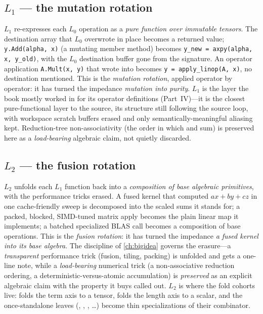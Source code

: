 \subsection*{$L_1$ --- the mutation rotation}

$L_1$ re-expresses each $L_0$ operation as a \emph{pure function over immutable
tensors}. The destination array that $L_0$ overwrote in place becomes a returned
value; \lstinline[style=l4style]|y.Add(alpha, x)| (a mutating member method) becomes
\lstinline[style=l4style]|y_new = axpy(alpha, x, y_old)|, with the $L_0$ destination
buffer gone from the signature. An operator application \lstinline[style=l4style]|A.Mult(x, y)|
that wrote into  becomes \lstinline[style=l4style]|y = apply_linop(A, x)|, no
destination mentioned. This is the \emph{mutation rotation}, applied operator by
operator: it has turned the impedance \emph{mutation into purity}. $L_1$ is the layer
the book mostly worked in for its operator definitions (Part~IV)---it is the closest
pure-functional layer to the source, its structure still following the source loop,
with workspace scratch buffers erased and only semantically-meaningful aliasing kept.
Reduction-tree non-associativity (the order in which  and  sum)
is preserved here as a \emph{load-bearing} algebraic claim, not quietly discarded.

\subsection*{$L_2$ --- the fusion rotation}

$L_2$ unfolds each $L_1$ function back into a \emph{composition of base algebraic
primitives}, with the performance tricks erased. A fused kernel that computed
$a x + b y + c z$ in one cache-friendly sweep is decomposed into the scaled sums it
stands for; a packed, blocked, SIMD-tuned matrix apply becomes the plain linear map it
implements; a batched specialized BLAS call becomes a composition of base operations.
This is the \emph{fusion rotation}: it has turned the impedance \emph{a fused kernel
into its base algebra}. The discipline of \cref{ch:bigidea} governs the erasure---a
\emph{transparent} performance trick (fusion, tiling, packing) is unfolded and gets a
one-line note, while a \emph{load-bearing} numerical trick (a non-associative reduction
ordering, a deterministic-versus-atomic accumulation) is \emph{preserved} as an
explicit algebraic claim with the property it buys called out. $L_2$ is where the
fold cohorts live:  folds the term axis to a tensor,
 folds the length axis to a scalar, and the once-standalone leaves
(, , , \dots) become thin specializations of their
combinator.

